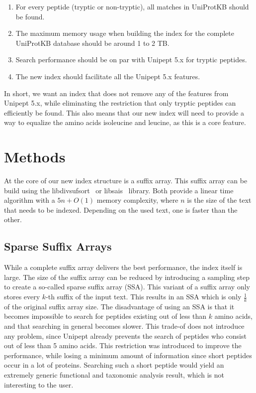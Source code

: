 \documentclass[11pt]{article}
\begin{document}
\begin{multicols}{2}
        \begin{enumerate}
            \item For every peptide (tryptic or non-tryptic), all matches in UniProtKB should be found.
            \item The maximum memory usage when building the index for the complete UniProtKB database should be around 1 to 2 TB\@.
            \item Search performance should be on par with Unipept 5.x for tryptic peptides.
            \item The new index should facilitate all the Unipept 5.x features.
        \end{enumerate}

        In short, we want an index that does not remove any of the features from Unipept 5.x, while eliminating the restriction that only tryptic peptides can efficiently be found.
        This also means that our new index will need to provide a way to equalize the amino acids isoleucine and leucine, as this is a core feature.


        \section{Methods}\label{sec:methods}
        At the core of our new index structure is a suffix array.
        This suffix array can be build using the libdivsufsort~\cite{libdivsufsort} or libsais~\cite{libsais} library.
        Both provide a linear time algorithm with a $5n + O(1)$ memory complexity, where $n$ is the size of the text that needs to be indexed.
        Depending on the used text, one is faster than the other.

        \subsection{Sparse Suffix Arrays}
        While a complete suffix array delivers the best performance, the index itself is large.
        The size of the suffix array can be reduced by introducing a sampling step to create a so-called sparse suffix array (SSA).
        This variant of a suffix array only stores every $k$-th suffix of the input text.
        This results in an SSA which is only $\frac{1}{k}$ of the original suffix array size.
        The disadvantage of using an SSA is that it becomes impossible to search for peptides existing out of less than $k$ amino acids, and that searching in general becomes slower.
        This trade-of does not introduce any problem, since Unipept already prevents the search of peptides who consist out of less than 5 amino acids.
        This restriction was introduced to improve the performance, while losing a minimum amount of information since short peptides occur in a lot of proteins.
        Searching such a short peptide would yield an extremely generic functional and taxonomic analysis result, which is not interesting to the user.


\end{multicols}
\end{document}
